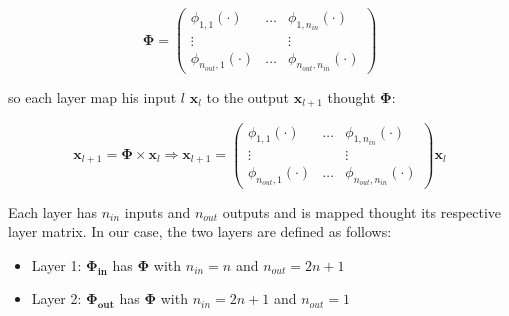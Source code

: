 \[
\boldsymbol{\Phi} = 
\begin{pmatrix}
\phi_{1,1}(\cdot) & \dots & \phi_{1,n_{in}}(\cdot) \\
\vdots &   & \vdots \\
\phi_{n_{out},1}(\cdot) & \dots & \phi_{n_{out},n_{in}}(\cdot)
\end{pmatrix} 
\]

so each layer map his input $l$ $\textbf{x}_l$ to the output $\textbf{x}_{l+1}$ thought $\boldsymbol{\Phi}$:

\[
\textbf{x}_{l+1} = \boldsymbol{\Phi} \times \textbf{x}_l \Rightarrow
\textbf{x}_{l+1} = 
\begin{pmatrix}
\phi_{1,1}(\cdot) & \dots & \phi_{1,n_{in}}(\cdot) \\
\vdots &   & \vdots \\
\phi_{n_{out},1}(\cdot) & \dots & \phi_{n_{out},n_{in}}(\cdot)
\end{pmatrix} \textbf{x}_l
\]


Each layer has $n_{in}$ inputs and $n_{out}$ outputs and is mapped thought its respective layer matrix. In our case, the two layers are defined as follows:
\begin{itemize}
    \item Layer 1: $\boldsymbol{\Phi_{in}}$ has $\boldsymbol{\Phi}$ with $n_{in} = n$ and $n_{out} = 2n+1$
    \item Layer 2: $\boldsymbol{\Phi_{out}}$ has $\boldsymbol{\Phi}$ with $n_{in} = 2n+1$ and $n_{out} = 1$
\end{itemize}